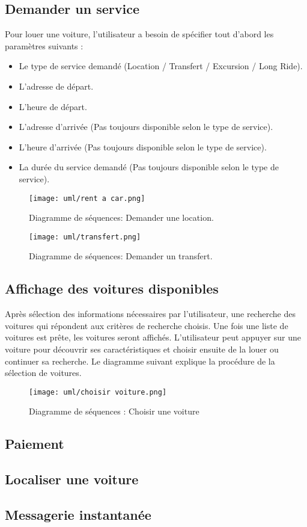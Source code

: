 \subsection{Demander un service}
Pour louer une voiture, l'utilisateur a besoin de spécifier tout d'abord les paramètres suivants :
\begin{itemize}
    \item Le type de service demandé (Location / Transfert / Excursion / Long Ride).
    \item L'adresse de départ.
    \item L'heure de départ.
    \item L'adresse d'arrivée (Pas toujours disponible selon le type de service).
    \item L'heure d'arrivée (Pas toujours disponible selon le type de service).
    \item La durée du service demandé (Pas toujours disponible selon le type de service).
\end{itemize}
\vspace{1cm}
\begin{figure}[H]
    \centering
    \texttt{[image: uml/rent a car.png]}
    \vspace{1cm}
    \caption{Diagramme de séquences: Demander une location.}
    \label{fig:seq_location}
\end{figure}
\vspace{1cm}
\begin{figure}[H]
    \centering
    \texttt{[image: uml/transfert.png]}
    \vspace{1cm}
    \caption{Diagramme de séquences: Demander un transfert.}
    \label{fig:seq_transfert}
\end{figure}
\subsection{Affichage des voitures disponibles}
Après sélection des informations nécessaires par l'utilisateur, une recherche des voitures qui répondent aux critères de recherche choisis. Une fois une liste de voitures est prête, les voitures seront affichés. L'utilisateur peut appuyer sur une voiture pour découvrir ses caractéristiques et choisir ensuite de la louer ou continuer sa recherche.
Le diagramme suivant explique la procédure de la sélection de voitures.
\vspace{1cm}
\begin{figure}[H]
    \centering
    \texttt{[image: uml/choisir voiture.png]}
    \vspace{1cm}
    \caption{Diagramme de séquences : Choisir une voiture}
    \label{fig:seq_car_select}
\end{figure}
\subsection{Paiement}
\subsection{Localiser une voiture}
\subsection{Messagerie instantanée}